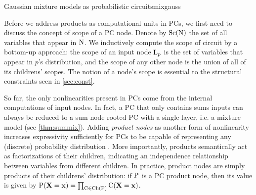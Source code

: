 \begin{example}[sidebyside,lefthand width=0.55\textwidth]{Gaussian mixture models as probabilistic circuits}{mixgauss}
\begin{center}
  \end{center}
\end{example}

Before we address products as computational units in PCs, we first need to discuss the concept of
scope of a PC node. Denote by $\operatorname*{\normalfont{Sc}}(\operatorname{\normalfont{N}})$ the set of all variables that appear in $\operatorname{\normalfont{N}}$.  We
inductively compute the scope of circuit by a bottom-up approach: the scope of an input node
$\operatorname{\normalfont{L}}_p$ is the set of variables that appear in $p$'s distribution, and the scope of any other
node is the union of all of its childrens' scopes. The notion of a node's scope is essential to the
structural constraints seen in \cref{sec:const}.

So far, the only nonlinearities present in PCs come from the internal computations of input nodes.
In fact, a PC that only contains sums inputs can always be reduced to a sum node rooted PC with a
single layer, i.e. a mixture model (see \cref{thm:summix}). Adding \emph{product nodes} as another
form of nonlinearity increases expressivity sufficiently for PCs to be capable of representing any
(discrete) probability distribution \citep{darwiche03,martens14,peharz15}. More importantly,
products semantically act as factorizations of their children, indicating an independence
relationship between variables from different children. In practice, product nodes are simply
products of their childrens' distribution: if $\operatorname{\normalfont{P}}$ is a PC product node, then its value is given
by $\operatorname{\normalfont{P}}(\mathbf{X}=\mathbf{x})=\prod_{\operatorname{\normalfont{C}}\in\operatorname*{\normalfont{Ch}}(\operatorname{\normalfont{P}})}\operatorname{\normalfont{C}}(\mathbf{X}=\mathbf{x})$.

